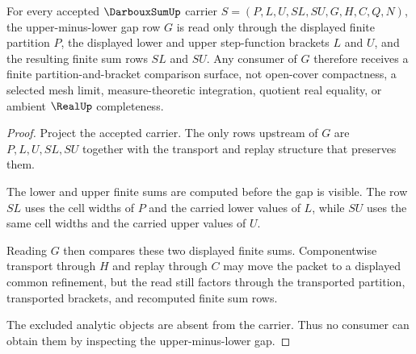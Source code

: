 \begin{theorem}\label{thm:darboux-sum-upper-lower-gap}
For every accepted $\DarbouxSumUp$ carrier $S=(P,L,U,SL,SU,G,H,C,Q,N)$, the upper-minus-lower gap row $G$ is read only through the displayed finite partition $P$, the displayed lower and upper step-function brackets $L$ and $U$, and the resulting finite sum rows $SL$ and $SU$. Any consumer of $G$ therefore receives a finite partition-and-bracket comparison surface, not open-cover compactness, a selected mesh limit, measure-theoretic integration, quotient real equality, or ambient $\RealUp$ completeness.
\end{theorem}
\begin{proof}
Project the accepted carrier. The only rows upstream of $G$ are $P,L,U,SL,SU$ together with the transport and replay structure that preserves them.

The lower and upper finite sums are computed before the gap is visible. The row $SL$ uses the cell widths of $P$ and the carried lower values of $L$, while $SU$ uses the same cell widths and the carried upper values of $U$.

Reading $G$ then compares these two displayed finite sums. Componentwise transport through $H$ and replay through $C$ may move the packet to a displayed common refinement, but the read still factors through the transported partition, transported brackets, and recomputed finite sum rows.

The excluded analytic objects are absent from the carrier. Thus no consumer can obtain them by inspecting the upper-minus-lower gap.
\end{proof}


\begin{closurestatus}{\DarbouxSumUp}
  \theoryclosure{\seedClosure}
  \formalstatus{\unformalizedV}
\end{closurestatus}
